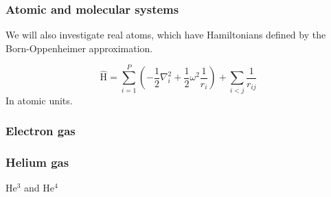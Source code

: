 \subsubsection{Atomic and molecular systems} \label{subsubsec:atomic}
We will also investigate real atoms, which have Hamiltonians defined by the Born-Oppenheimer approximation.  

\begin{equation}
\label{eq:AtomicHamiltonian}
\hat{\text{H}} = \sum_{i=1}^{P} (-\frac{1}{2} \nabla_i^2 + \frac{1}{2} \omega^2 \frac{1}{r_i}) + \sum_{i<j} \frac{1}{r_{ij}} 
\end{equation}
In atomic units. 

\subsubsection{Electron gas} \label{subsubsec:electrongas}
\subsubsection{Helium gas} \label{subsubsec:heliumgas}
He$^3$ and He$^4$

